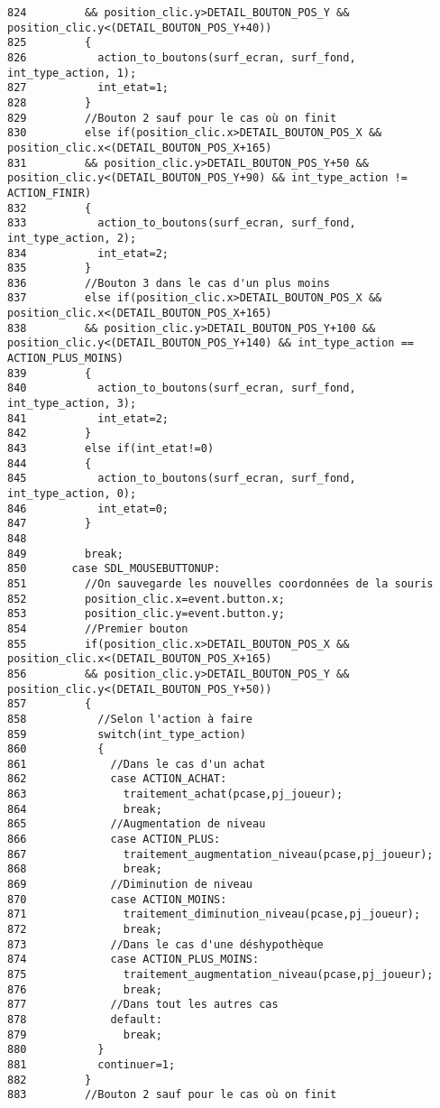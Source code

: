 \begin{Code}
\begin{verbatim}
824         && position_clic.y>DETAIL_BOUTON_POS_Y && position_clic.y<(DETAIL_BOUTON_POS_Y+40))
825         {
826           action_to_boutons(surf_ecran, surf_fond, int_type_action, 1);
827           int_etat=1;
828         }
829         //Bouton 2 sauf pour le cas où on finit
830         else if(position_clic.x>DETAIL_BOUTON_POS_X && position_clic.x<(DETAIL_BOUTON_POS_X+165)
831         && position_clic.y>DETAIL_BOUTON_POS_Y+50 && position_clic.y<(DETAIL_BOUTON_POS_Y+90) && int_type_action != ACTION_FINIR)
832         {
833           action_to_boutons(surf_ecran, surf_fond, int_type_action, 2);
834           int_etat=2;
835         }
836         //Bouton 3 dans le cas d'un plus moins
837         else if(position_clic.x>DETAIL_BOUTON_POS_X && position_clic.x<(DETAIL_BOUTON_POS_X+165)
838         && position_clic.y>DETAIL_BOUTON_POS_Y+100 && position_clic.y<(DETAIL_BOUTON_POS_Y+140) && int_type_action == ACTION_PLUS_MOINS)
839         {
840           action_to_boutons(surf_ecran, surf_fond, int_type_action, 3);
841           int_etat=2;
842         }
843         else if(int_etat!=0)
844         {
845           action_to_boutons(surf_ecran, surf_fond, int_type_action, 0);
846           int_etat=0;
847         }
848         
849         break;
850       case SDL_MOUSEBUTTONUP:
851         //On sauvegarde les nouvelles coordonnées de la souris
852         position_clic.x=event.button.x;
853         position_clic.y=event.button.y;
854         //Premier bouton
855         if(position_clic.x>DETAIL_BOUTON_POS_X && position_clic.x<(DETAIL_BOUTON_POS_X+165)
856         && position_clic.y>DETAIL_BOUTON_POS_Y && position_clic.y<(DETAIL_BOUTON_POS_Y+50))
857         {
858           //Selon l'action à faire
859           switch(int_type_action)
860           {
861             //Dans le cas d'un achat
862             case ACTION_ACHAT:
863               traitement_achat(pcase,pj_joueur);
864               break;
865             //Augmentation de niveau
866             case ACTION_PLUS:
867               traitement_augmentation_niveau(pcase,pj_joueur);
868               break;
869             //Diminution de niveau
870             case ACTION_MOINS:
871               traitement_diminution_niveau(pcase,pj_joueur);
872               break;
873             //Dans le cas d'une déshypothèque
874             case ACTION_PLUS_MOINS:
875               traitement_augmentation_niveau(pcase,pj_joueur);
876               break;
877             //Dans tout les autres cas
878             default:
879               break;
880           }
881           continuer=1;
882         }
883         //Bouton 2 sauf pour le cas où on finit

\end{verbatim}
\end{Code}

